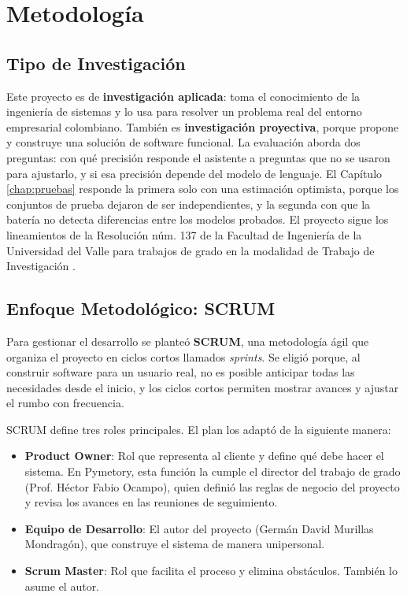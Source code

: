 
\section{Metodología}

\subsection{Tipo de Investigación}

Este proyecto es de \textbf{investigación aplicada}: toma el conocimiento de la ingeniería de sistemas y lo usa para resolver un problema real del entorno empresarial colombiano. También es \textbf{investigación proyectiva}, porque propone y construye una solución de software funcional. La evaluación aborda dos preguntas: con qué precisión responde el asistente a preguntas que no se usaron para ajustarlo, y si esa precisión depende del modelo de lenguaje. El Capítulo \ref{chap:pruebas} responde la primera solo con una estimación optimista, porque los conjuntos de prueba dejaron de ser independientes, y la segunda con que la batería no detecta diferencias entre los modelos probados. El proyecto sigue los lineamientos de la Resolución núm. 137 de la Facultad de Ingeniería de la Universidad del Valle para trabajos de grado en la modalidad de Trabajo de Investigación \cite{univalle_resolucion137}.

\subsection{Enfoque Metodológico: SCRUM}

Para gestionar el desarrollo se planteó \textbf{SCRUM}, una metodología ágil que organiza el proyecto en ciclos cortos llamados \textit{sprints}. Se eligió porque, al construir software para un usuario real, no es posible anticipar todas las necesidades desde el inicio, y los ciclos cortos permiten mostrar avances y ajustar el rumbo con frecuencia.

SCRUM define tres roles principales. El plan los adaptó de la siguiente manera:

\begin{itemize}
    \item \textbf{Product Owner}: Rol que representa al cliente y define qué debe hacer el sistema. En Pymetory, esta función la cumple el director del trabajo de grado (Prof. Héctor Fabio Ocampo), quien definió las reglas de negocio del proyecto y revisa los avances en las reuniones de seguimiento.
    \item \textbf{Equipo de Desarrollo}: El autor del proyecto (Germán David Murillas Mondragón), que construye el sistema de manera unipersonal.
    \item \textbf{Scrum Master}: Rol que facilita el proceso y elimina obstáculos. También lo asume el autor.
\end{itemize}

